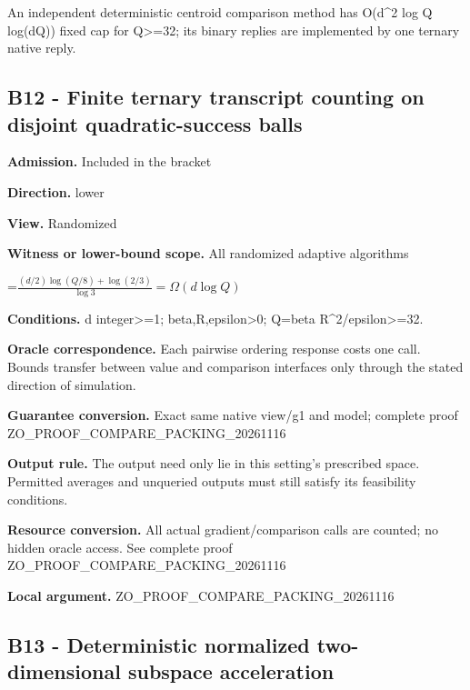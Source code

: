 \documentclass[10pt,a4paper]{article}
\newcommand{\AtlasMath}[1]{\par\begingroup\centering\setbox0=\hbox{$\displaystyle #1$}\ifdim\wd0>1.4\linewidth\typeout{ATLAS WIDE FORMULA: \the\wd0}\fi\ifdim\wd0>\linewidth\resizebox{\linewidth}{!}{\box0}\else\box0\fi\par\endgroup}
\begin{document}
An independent deterministic centroid comparison method has O(d\textasciicircum{}2 log Q log(dQ)) fixed cap for Q>=32; its binary replies are implemented by one ternary native reply.



\subsection{B12 - Finite ternary transcript counting on disjoint quadratic-success balls}


\textbf{Admission.} Included in the bracket



\textbf{Direction.} lower



\textbf{View.} Randomized



\textbf{Witness or lower-bound scope.} All randomized adaptive algorithms



\AtlasMath{\frac{(d/2)\log(Q/8)+\log(2/3)}{\log 3}=\Omega(d\log Q)}


\textbf{Conditions.} d integer>=1; beta,R,epsilon>0; Q=beta R\textasciicircum{}2/epsilon>=32.



\textbf{Oracle correspondence.} Each pairwise ordering response costs one call. Bounds transfer between value and comparison interfaces only through the stated direction of simulation.



\textbf{Guarantee conversion.} Exact same native view/g1 and model; complete proof ZO\_PROOF\_COMPARE\_PACKING\_20261116



\textbf{Output rule.} The output need only lie in this setting's prescribed space. Permitted averages and unqueried outputs must still satisfy its feasibility conditions.



\textbf{Resource conversion.} All actual gradient/comparison calls are counted; no hidden oracle access. See complete proof ZO\_PROOF\_COMPARE\_PACKING\_20261116



\textbf{Local argument.} ZO\_PROOF\_COMPARE\_PACKING\_20261116



\subsection{B13 - Deterministic normalized two-dimensional subspace acceleration}
\end{document}
